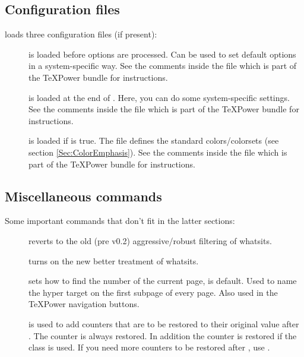 \documentclass[12pt]{scrartcl}
\let\newslide=\relax
\begin{document}
\newslide

\subsection{Configuration files}\label{Sec:Config}
 loads three configuration files (if present):
\begin{description}
\item[]
  is loaded before options are processed. Can be used to set default options
  in a system-specific way. See the comments inside the file
   which is part of the \TeX Power bundle
  for instructions.

\item[]
  is loaded at the end of . Here, you can do some
  system-specific settings. See the comments inside the
  file  which is part of the
  \TeX Power bundle for instructions.

\item[]
  is loaded if  is true. The file defines the standard
  colors/colorsets (see section \ref{Sec:ColorEmphasis}). See the
  comments inside the file  which is part of the
  \TeX Power bundle for instructions.
\end{description}

\newslide

\subsection{Miscellaneous commands}\label{Sec:MiscCmd}
Some important commands that don't fit in the latter sections:
\begin{description}
\item[]
  reverts to the old (pre v0.2) aggressive/robust filtering of whatsits.
\item[]
  turns on the new better treatment of whatsits.
\item[]
  sets how to find the number of the current page,  is default.
  Used to name the hyper target on the first subpage of every page. Also used in the
  TeXPower navigation buttons.
\item[]
  is used to add counters that are to be restored to their original value after . The 
  counter is always restored. In addition the  counter is restored if the  class is used. If
  you need more counters to be restored after , use .
\end{description}
\end{document}
